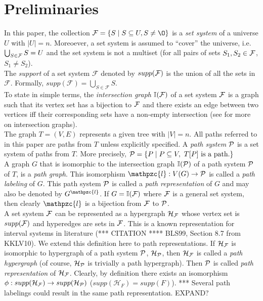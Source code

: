 \documentclass{llncs}
\def\cF{{\cal F}}
\def\cP{{\cal P}}
\def\F{{\mathcal F}}
\def\H{{\mathcal H}}
\def\bI{\mathbb I}
\def\cl{\mathpzc{l}}
\begin{document}
\section{Preliminaries} \label{prelims} 
\noindent
In this paper, the collection $\F = \{S \mid S \subseteq U, S \ne \O
\}$ is a {\em set system} of a universe $U$ with $|U| = n$. 
Moreoever, a set system is assumed to ``cover'' the universe,
i.e. $ \bigcup_{S \in \cF}S = U$ and the set system is not a multiset
(for all pairs of sets $S_1, S_2 \in \cF$, $S_1 \ne S_2$). \\

\noindent
The {\em support} of a set system $\F$ denoted by  $supp(\cF)$ is the
union of all the sets in $\F$. Formally, $supp(\F) =
\bigcup_{S \in \F}S$.\\

\noindent
To state in simple terms, the {\em intersection graph} $\bI(\cF)$ of a
set system $\cF$ is a graph such that its vertex set has a bijection
to $\cF$ and there exists an edge between two vertices iff their
corresponding sets have a non-empty
intersection (see \cite{mcg04} for more on intersection graphs). \\


\noindent
The graph $T=(V,E)$ represents a given tree with $|V| = n$. 
All paths
referred to in this paper are paths from $T$ unless explicitly
specified. A {\em path system} $\cP$ is a set system of paths from
$T$. More precisely, $\cP = \{P \mid P \subseteq V, \text{ } T[P] \text{ is a path.} \}$\\

\noindent
A graph $G$ that is isomorphic to the intersection graph $\bI(\cP)$ of a
path system $\cP$ of $T$, is a {\em path graph}. This
isomorphism $\cl: V(G) \rightarrow \cP$ is called a {\em path
  labeling} of $G$. This path system $\cP$ is called a {\em path
representation} of $G$ and may also be denoted by $G^\cl$. If $G =
\bI(\cF)$ where $\cF$ is a general set system, then clearly $\cl$ is a
bijection from $\cF$ to $\cP$. \\

\noindent
A set system $\cF$ can be represented as a hypergraph $\H_\cF$ whose
vertex set is $supp(\cF)$ and hyperedges are sets in $\cF$. This is a
known representation for interval systems in literature (*** CITATION ****
BLS99, Section 8.7 from KKLV10). We extend this definition here to
path representations.
\noindent
If $\H_\cF$ is isomorphic to hypergraph of a path system $\cP$,
$\H_\cP$, then $\H_\cF$ is called a {\em path hypergraph} (of course,
$\H_\cP$ is trivially a path hypergraph). Then $\cP$
is called {\em path representation} of $\H_\cF$. Clearly, by definition there exists an
isomorphism $\phi: supp(\H_\cF) \rightarrow supp(\H_\cP)$ ($supp(\H_F)
= supp (F)$).
*** Several path labelings could result in the same path representation. EXPAND?
\end{document}
